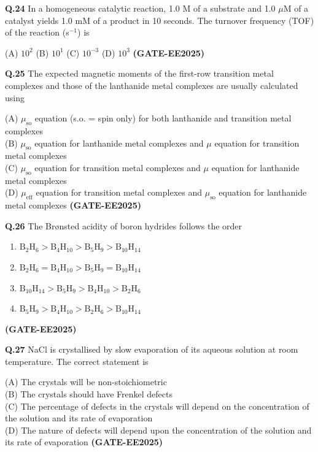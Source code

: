 \documentclass[12pt]{article}
\begin{document}
\begin{enumerate}
\vspace{0.5cm}

\textbf{Q.24} In a homogeneous catalytic reaction, 1.0 M of a substrate and 1.0 $\mu$M of a catalyst yields 1.0 mM of a product in 10 seconds. The turnover frequency (TOF) of the reaction (s$^{-1}$) is

(A) $10^2$ \hspace{1cm}
(B) $10^1$ \hspace{1cm}
(C) $10^{-3}$ \hspace{1cm}
(D) $10^3$   \textbf{(GATE-EE2025)}


\textbf{Q.25} The expected magnetic moments of the first-row transition metal complexes and those of the lanthanide metal complexes are usually calculated using

(A) $\mu_{\text{so}}$ equation (s.o. = spin only) for both lanthanide and transition metal complexes\\
(B) $\mu_{\text{so}}$ equation for lanthanide metal complexes and $\mu$ equation for transition metal complexes\\
(C) $\mu_{\text{so}}$ equation for transition metal complexes and $\mu$ equation for lanthanide metal complexes\\
(D) $\mu_{\text{eff}}$ equation for transition metal complexes and $\mu_{\text{so}}$ equation for lanthanide metal complexes   \textbf{(GATE-EE2025)}


\vspace{0.5cm}

\textbf{Q.26} \quad The Brønsted acidity of boron hydrides follows the order

\begin{enumerate}
    \item[(A)] $\mathrm{B_2H_6 > B_4H_{10} > B_5H_9 > B_{10}H_{14}}$
    \item[(B)] $\mathrm{B_2H_6 = B_4H_{10} > B_5H_9 = B_{10}H_{14}}$
    \item[(C)] $\mathrm{B_{10}H_{14} > B_5H_9 > B_4H_{10} > B_2H_6}$
    \item[(D)] $\mathrm{B_5H_9 > B_4H_{10} > B_2H_6 > B_{10}H_{14}}$
\end{enumerate} \textbf{(GATE-EE2025)}

\vspace{0.5cm}

\textbf{Q.27} NaCl is crystallised by slow evaporation of its aqueous solution at room temperature. The correct statement is

(A) The crystals will be non-stoichiometric\\
(B) The crystals should have Frenkel defects\\
(C) The percentage of defects in the crystals will depend on the concentration of the solution and its rate of evaporation\\
(D) The nature of defects will depend upon the concentration of the solution and its rate of evaporation   \textbf{(GATE-EE2025)}



\end{enumerate}
\end{document}
